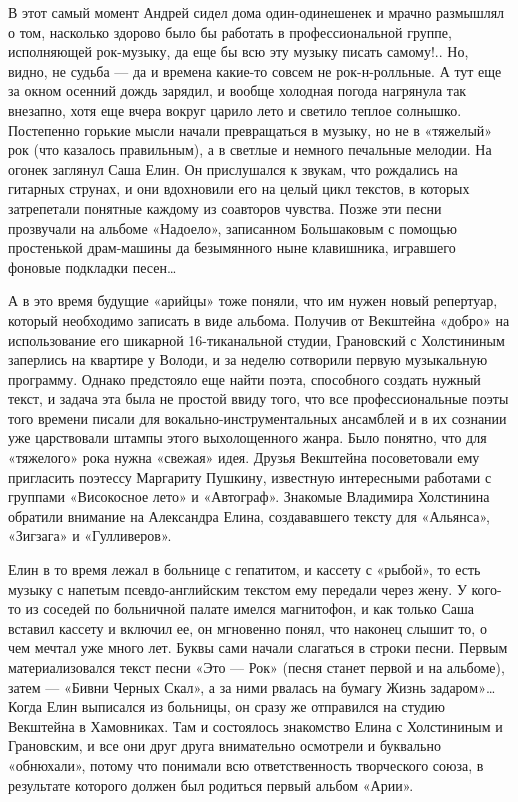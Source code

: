 \documentclass[16pt,a5paper]{book}
\begin{document}
В этот самый момент Андрей сидел дома один-одинешенек и мрачно размышлял о том, насколько здорово было бы работать в
профессиональной группе, исполняющей рок-музыку, да еще бы всю эту музыку писать самому!.. Но, видно, не судьба — да и
времена какие-то совсем не рок-н-ролльные. А тут еще за окном осенний дождь зарядил, и вообще холодная погода нагрянула
так внезапно, хотя еще вчера вокруг царило лето и светило теплое солнышко. Постепенно горькие мысли начали превращаться
в музыку, но не в «тяжелый» рок (что казалось правильным), а в светлые и немного печальные мелодии. На огонек заглянул
Саша Елин. Он прислушался к звукам, что рождались на гитарных струнах, и они вдохновили его на целый цикл текстов, в
которых затрепетали понятные каждому из соавторов чувства. Позже эти песни прозвучали на альбоме «Надоело», записанном
Большаковым с помощью простенькой драм-машины да безымянного ныне клавишника, игравшего фоновые подкладки песен\ldots

А в это время будущие «арийцы» тоже поняли, что им нужен новый репертуар, который необходимо записать в виде альбома.
Получив от Векштейна «добро» на использование его шикарной 16-тиканальной студии, Грановский с Холстининым заперлись на
квартире у Володи, и за неделю сотворили первую музыкальную программу. Однако предстояло еще найти поэта, способного
создать нужный текст, и задача эта была не простой ввиду того, что все профессиональные поэты того времени писали для
вокально-инструментальных ансамблей и в их сознании уже царствовали штампы этого выхолощенного жанра. Было понятно, что
для «тяжелого» рока нужна «свежая» идея. Друзья Векштейна посоветовали ему пригласить поэтессу Маргариту Пушкину,
известную интересными работами с группами «Високосное лето» и «Автограф». Знакомые Владимира Холстинина обратили
внимание на Александра Елина, создававшего тексту для «Альянса», «Зигзага» и «Гулливеров».

Елин в то время лежал в больнице с гепатитом, и кассету с «рыбой», то есть музыку с напетым псевдо-английским текстом
ему передали через жену. У кого-то из соседей по больничной палате имелся магнитофон, и как только Саша вставил кассету
и включил ее, он мгновенно понял, что наконец слышит то, о чем мечтал уже много лет. Буквы сами начали слагаться в
строки песни. Первым материализовался текст песни «Это — Рок» (песня станет первой и на альбоме), затем — «Бивни Черных
Скал», а за ними рвалась на бумагу Жизнь задаром»\ldots Когда Елин выписался из больницы, он сразу же отправился на
студию Векштейна в Хамовниках. Там и состоялось знакомство Елина с Холстининым и Грановским, и все они друг друга
внимательно осмотрели и буквально «обнюхали», потому что понимали всю ответственность творческого союза, в результате
которого должен был родиться первый альбом «Арии».
\end{document}
